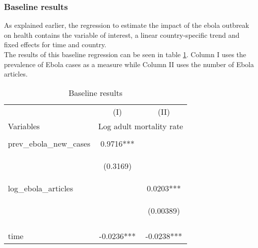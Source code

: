 \documentclass{article}
\begin{document}
\subsubsection{Baseline results}

As explained earlier, the regression to estimate the impact of the ebola outbreak on health contains the variable of interest, a linear country-specific trend and fixed effects for time and country.\\
The results of this baseline regression can be seen in table \ref{Baseline results}. Column I uses the prevalence of Ebola cases as a measure while Column II uses the number of Ebola articles.

\begin{center}
\begin{table}[htbp]\centering  \caption{Baseline results \label{Baseline results}}
\begin{tabular}{lcc} \hline
 & (I) & (II) \\
Variables & \multicolumn{2}{c}{Log adult mortality rate} \\ \hline
\vspace{4pt} & \begin{footnotesize}\end{footnotesize} & \begin{footnotesize}\end{footnotesize} \\
prev\_ebola\_new\_cases & 0.9716*** &  \\
\vspace{4pt} & \begin{footnotesize}(0.3169)\end{footnotesize} & \begin{footnotesize}\end{footnotesize} \\
log\_ebola\_articles &  & 0.0203*** \\
 & \begin{footnotesize}\end{footnotesize} & \begin{footnotesize}(0.00389)\end{footnotesize} \\
\vspace{4pt} & \begin{footnotesize}\end{footnotesize} & \begin{footnotesize}\end{footnotesize} \\
time & -0.0236*** & -0.0238*** \\

\end{tabular}
\end{table}
\end{center}
\end{document}
